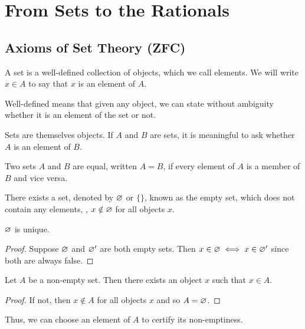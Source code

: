 \chapter{From Sets to the Rationals} \label{sec:szq}

\section{Axioms of Set Theory (ZFC)} \label{sec:zfc}

\begin{definition*}[Set] \label{def:zfc:set}
    A set is a well-defined collection of objects, which we call elements.
    We will write $x \in A$ to say that $x$ is an element of $A$.
\end{definition*}
Well-defined means that given any object, we can state without ambiguity whether
it is an element of the set or not.

\begin{axiom} \label{def:zfc:sets_are_objects}
    Sets are themselves objects.
    If $A$ and $B$ are sets, it is meaningful to ask whether $A$ is an element
    of $B$.
\end{axiom}

\begin{axiom}[Extensionality] \label{def:zfc:extensionality}
    Two sets $A$ and $B$ are equal, written $A = B$, if every element of $A$ is
    a member of $B$ and vice versa.
\end{axiom}

\begin{axiom}[Existence] \label{def:zfc:existence}
    There exists a set, denoted by $\varnothing$ or $\{\}$, known as the empty set, which
    does not contain any elements, \ie, $x \notin \varnothing$ for all objects $x$.
\end{axiom}

\begin{problem}
    $\varnothing$ is unique.
\end{problem}
\begin{proof}
    Suppose $\varnothing$ and $\varnothing'$ are both empty sets.
    Then $x \in \varnothing \iff x \in \varnothing'$ since both are always false.
\end{proof}

\begin{lemma} \label{thm:zfc:single_choice}
    Let $A$ be a non-empty set.
    Then there exists an object $x$ such that $x \in A$.
\end{lemma}
\begin{proof}
    If not, then $x \notin A$ for all objects $x$ and so $A = \varnothing$.
\end{proof}
Thus, we can choose an element of $A$ to certify its non-emptiness.

